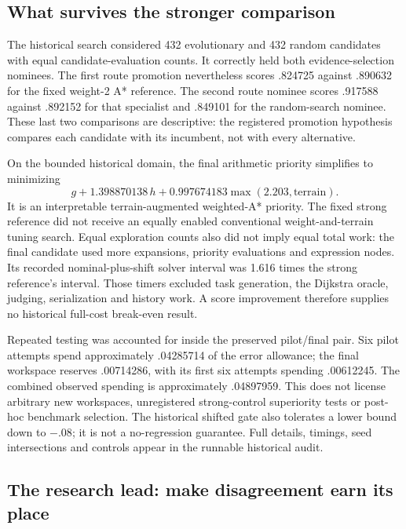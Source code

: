 \subsection{What survives the stronger comparison}

The historical search considered 432 evolutionary and 432 random candidates with equal candidate-evaluation counts. It correctly held both evidence-selection nominees. The first route promotion nevertheless scores .824725 against .890632 for the fixed weight-2 A* reference. The second route nominee scores .917588 against .892152 for that specialist and .849101 for the random-search nominee. These last two comparisons are descriptive: the registered promotion hypothesis compares each candidate with its incumbent, not with every alternative.

On the bounded historical domain, the final arithmetic priority simplifies to minimizing
\begin{equation}
 g+1.398870138\,h+0.997674183\max(2.203,\mathrm{terrain}).
\end{equation}
It is an interpretable terrain-augmented weighted-A* priority. The fixed strong reference did not receive an equally enabled conventional weight-and-terrain tuning search. Equal exploration counts also did not imply equal total work: the final candidate used more expansions, priority evaluations and expression nodes. Its recorded nominal-plus-shift solver interval was 1.616 times the strong reference's interval. Those timers excluded task generation, the Dijkstra oracle, judging, serialization and history work. A score improvement therefore supplies no historical full-cost break-even result.

Repeated testing was accounted for inside the preserved pilot/final pair. Six pilot attempts spend approximately .04285714 of the error allowance; the final workspace reserves .00714286, with its first six attempts spending .00612245. The combined observed spending is approximately .04897959. This does not license arbitrary new workspaces, unregistered strong-control superiority tests or post-hoc benchmark selection. The historical shifted gate also tolerates a lower bound down to $-.08$; it is not a no-regression guarantee. Full details, timings, seed intersections and controls appear in the runnable historical audit.

\subsection{The research lead: make disagreement earn its place}

